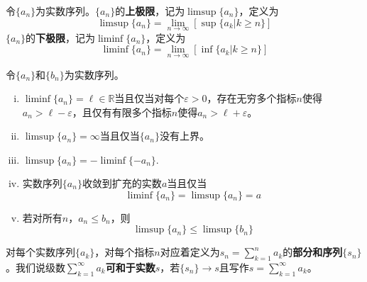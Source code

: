 \documentclass[lang=cn,newtx,10pt,scheme=chinese]{../Template/elegantbook}
\begin{document}
\begin{definition}[实数序列的上下极限]\label{definition:实数序列的上下极限}
  令\(\{a_n\}\)为实数序列。\(\{a_n\}\)的\textbf{上极限}，记为\(\limsup\{a_n\}\)，定义为
\[\limsup\{a_n\}=\lim_{n \to \infty}[\sup\{a_k|k \geqslant n\}]\]
\(\{a_n\}\)的\textbf{下极限}，记为\(\liminf\{a_n\}\)，定义为
\[\liminf\{a_n\}=\lim_{n \to \infty}[\inf\{a_k|k \geqslant n\}]\]
\end{definition}
  
\begin{proposition}[实数序列的上下极限的等价命题]\label{definition:实数序列的上下极限的等价命题}
  令\(\{a_n\}\)和\(\{b_n\}\)为实数序列。
\begin{enumerate}[(i)]
  \item  \(\liminf\{a_n\}=\ell\in\mathbb{R}\)当且仅当对每个\(\varepsilon>0\)，存在无穷多个指标\(n\)使得\(a_n>\ell - \varepsilon\)，且仅有有限多个指标\(n\)使得\(a_n>\ell+\varepsilon\)。

  \item \(\limsup\{a_n\}=\infty\)当且仅当\(\{a_n\}\)没有上界。

  \item \(\limsup\{a_n\}=-\liminf\{-a_n\}.\)

  \item 实数序列\(\{a_n\}\)收敛到扩充的实数\(a\)当且仅当
\[\liminf\{a_n\}=\limsup\{a_n\}=a\]

  \item 若对所有\(n\)，\(a_n\leqslant b_n\)，则
\[\limsup\{a_n\}\leqslant\limsup\{b_n\}\]
\end{enumerate}
\end{proposition}

\begin{definition}[级数的部分和与可和]\label{definition:级数的部分和与可和}
  对每个实数序列\(\{a_k\}\)，对每个指标\(n\)对应着定义为\(s_n = \sum_{k = 1}^{n}a_k\)的\textbf{部分和序列}\(\{s_n\}\)。我们说级数\(\sum_{k = 1}^{\infty}a_k\)\textbf{可和于实数\(s\)}，若\(\{s_n\}\to s\)且写作\(s = \sum_{k = 1}^{\infty}a_k\)。
\end{definition}
\end{document}
